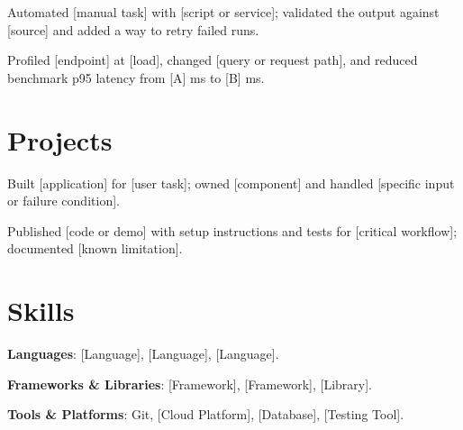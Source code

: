 \documentclass{resume}
\begin{document}
\begin{jobduties}
  \item Automated [manual task] with [script or service]; validated the output against [source] and added a way to retry failed runs.
  \item Profiled [endpoint] at [load], changed [query or request path], and reduced benchmark p95 latency from [A] ms to [B] ms.
\end{jobduties}

\section{Projects}

\begin{jobduties}
  \item Built [application] for [user task]; owned [component] and handled [specific input or failure condition].
  \item Published [code or demo] with setup instructions and tests for [critical workflow]; documented [known limitation].
\end{jobduties}

\section{Skills}
\begin{skillitems}
  \item \textbf{Languages}: [Language], [Language], [Language].
  \item \textbf{Frameworks \& Libraries}: [Framework], [Framework], [Library].
  \item \textbf{Tools \& Platforms}: Git, [Cloud Platform], [Database], [Testing Tool].
\end{skillitems}
\end{document}
